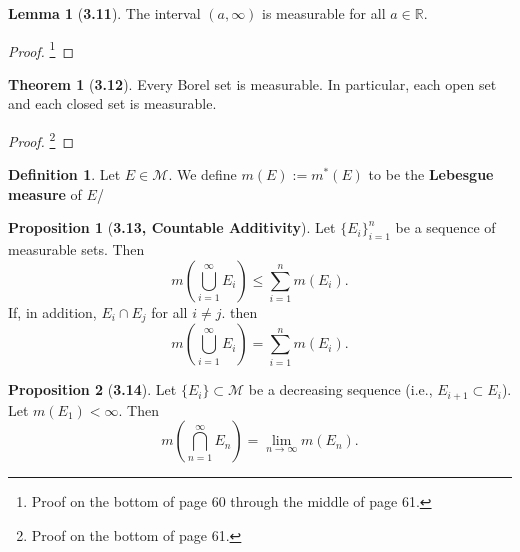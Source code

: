 \documentclass[12pt]{article}
\newcommand{\R}{\mathbb{R}}
\theoremstyle{definition}
\newtheorem*{thm}{Theorem}
\newtheorem*{definition}{Definition}
\newtheorem*{lemma}{Lemma}
\newtheorem*{prop}{Proposition}
\begin{document}
\begin{lemma}[\textbf{3.11}]

    The interval \( (a, \infty) \) is measurable for all \( a \in \R \).

        \begin{proof}\footnote{Proof on the bottom of page 60 through the middle of page 61.}
            
        \end{proof}
    
\end{lemma}

\begin{thm}[\textbf{3.12}]

    Every Borel set is measurable. In particular, each open set and each closed set is measurable.

        \begin{proof}\footnote{Proof on the bottom of page 61.} 
            
        \end{proof}

    
\end{thm}

\begin{definition}
    Let \( E \in \mathcal{M} \). We define \( m(E) := m^{*}(E) \) to be the \textbf{Lebesgue measure} of \( E \)/
\end{definition}

\begin{prop}[\textbf{3.13, Countable Additivity}]

    Let \( \{ E_i\}_{i=1}^{n} \) be a sequence of measurable sets. Then 
        \[
            m \left( \bigcup_{i=1}^{\infty} E_i \right) \leq \sum_{i=1}^{n} m(E_i).    
        \]
    If, in addition, \( E_i \cap E_j \) for all \( i \neq j \). then 
        \[
            m \left( \bigcup_{i=1}^{\infty} E_i \right) = \sum_{i=1}^{n} m(E_i).
        \]

    
\end{prop}

\begin{prop}[\textbf{3.14}]

    Let \( \{E_i\} \subset \mathcal{M} \) be a decreasing sequence (i.e., \( E_{i+1} \subset E_i \)). Let \( m(E_1) < \infty \). Then
        \[
            m\left( \bigcap_{n=1}^{\infty} E_n \right) = \lim_{n \to \infty} m(E_n).
        \]
    
\end{prop}
\end{document}

